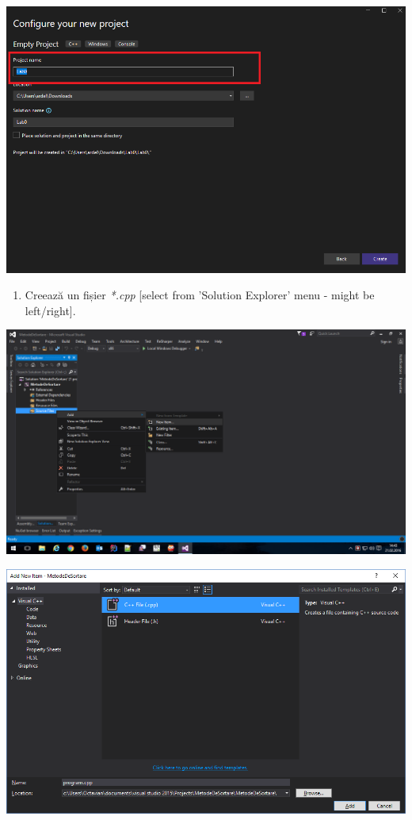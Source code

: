 \documentclass[../ro-fa-lab.tex]{subfiles}
\begin{document}
\includegraphics[width=\textwidth]{../Resources/lab0/create_project3.png}

\begin{enumerate}
\def\labelenumi{\arabic{enumi}.}
\setcounter{enumi}{3}
\item
  Creează un fișier \emph{*.cpp} [select from 'Solution Explorer' menu - might be left/right].
\end{enumerate}

\includegraphics[width=\textwidth]{../Resources/lab0/image4.png}

\includegraphics[width=\textwidth]{../Resources/lab0/image5.png}
\end{document}
